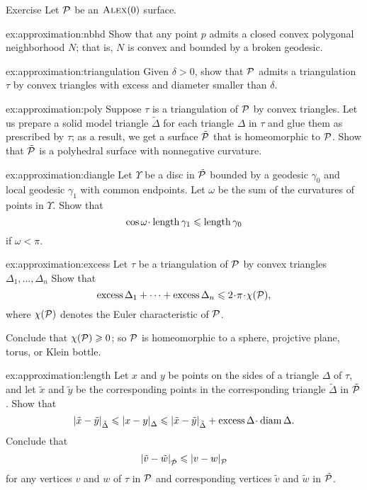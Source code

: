 \begin{thm}{Exercise}\label{ex:approximation}
Let $\mathcal{P}$ be an $\textsc{Alex}(0)$ surface.

\begin{subthm}{ex:approximation:nbhd}
Show that any point $p$ admits a closed convex polygonal neighborhood $N$;
that is, $N$ is convex and bounded by a broken geodesic.

\end{subthm}

\begin{subthm}{ex:approximation:triangulation}
Given $\delta>0$, show that $\mathcal{P}$ admits a triangulation $\tau$ by convex triangles
with excess and diameter smaller than $\delta$.
\end{subthm}

\begin{subthm}{ex:approximation:poly}
Suppose $\tau$ is a triangulation of $\mathcal{P}$ by convex triangles.
Let us prepare a solid model triangle $\tilde\Delta$ for each triangle $\Delta$ in $\tau$ and glue them as prescribed by $\tau$;
as a result, we get a surface $\tilde{\mathcal{P}}$ that is homeomorphic to $\mathcal{P}$.
Show that $\tilde{\mathcal{P}}$ is a polyhedral surface with nonnegative curvature.
\end{subthm}

\begin{subthm}{ex:approximation:diangle}
Let $\Upsilon$ be a disc in $\tilde{\mathcal{P}}$ bounded by a geodesic $\gamma_0$ and local geodesic $\gamma_1$ with common endpoints.
Let $\omega$ be the sum of the curvatures of points in $\Upsilon$.
Show that
\[\cos \omega\cdot \length \gamma_1\le \length \gamma_0\]
if $\omega<\pi$.
\end{subthm}


\begin{subthm}{ex:approximation:excess}
Let $\tau$ be a triangulation of $\mathcal{P}$ by convex triangles $\Delta_1,\dots,\Delta_n$
Show that
\[\excess\Delta_1+\dots+\excess\Delta_n \le 2\cdot\pi\cdot \chi(\spc{P}),\]
where $\chi(\mathcal{P})$ denotes the Euler characteristic of $\mathcal{P}$.

Conclude that $\chi(\mathcal{P})\geqslant 0$; so $\mathcal{P}$ is homeomorphic to a sphere, projctive plane, torus, or Klein bottle.
\end{subthm}


\begin{subthm}{ex:approximation:length}
Let $x$ and $y$ be points on the sides of a triangle $\Delta$ of $\tau$, and let $\tilde x$ and $\tilde y$ be the corresponding points in the corresponding triangle $\tilde \Delta$ in $\tilde{\mathcal{P}}$.
Show that
\[\dist{\tilde x}{\tilde y}{\tilde \Delta}\le\dist{x}{y}{\Delta}\le \dist{\tilde x}{\tilde y}{\tilde \Delta}+\excess\Delta\cdot \diam \Delta.\]
Conclude that
\[|{\tilde v}-{\tilde w}|_{\tilde {\mathcal{P}}}^{{}}\leqslant |{v}-{w}|_{\mathcal{P}}^{{}}\]
for any vertices $v$ and $w$ of $\tau$ in $\mathcal{P}$ and corresponding vertices $\tilde v$ and $\tilde w$ in $\tilde{\mathcal{P}}$.
\end{subthm}


\end{thm}
